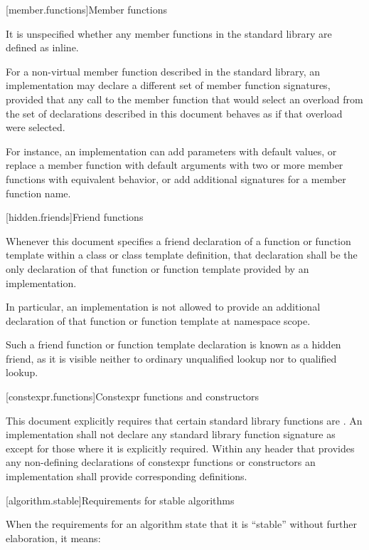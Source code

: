[member.functions]{Member functions}

\pnum
It is unspecified whether any member functions in the \Cpp{} standard library are defined as
inline.

\pnum
For a non-virtual member function described in the \Cpp{} standard library,
an implementation may declare a different set of member function signatures,
provided that any call to the member function that would select
an overload from the set of declarations described in this document
behaves as if that overload were selected.
\begin{note}
For instance, an implementation can add parameters with default values,
or replace a member function with default arguments
with two or more member functions with equivalent behavior,
or add additional signatures for a member function name.
\end{note}

[hidden.friends]{Friend functions}

\pnum
Whenever this document specifies
a friend declaration of a function or function template
within a class or class template definition,
that declaration shall be
the only declaration of that function or function template
provided by an implementation.
\begin{note}
In particular,
an implementation is not allowed to provide
an additional declaration of that function or function template
at namespace scope.
\end{note}
\begin{note}
Such a friend function or function template declaration
is known as a hidden friend,
as it is visible neither
to ordinary unqualified lookup nor
to qualified lookup.
\end{note}

[constexpr.functions]{Constexpr functions and constructors}

\pnum
This document explicitly requires that certain standard library functions are
. An implementation shall not declare
any standard library function signature as  except for those where
it is explicitly required.
Within any header that provides any non-defining declarations of constexpr
functions or constructors an implementation shall provide corresponding definitions.

[algorithm.stable]{Requirements for stable algorithms}

\pnum
{}%
%
When the requirements for an algorithm state that it is ``stable'' without further elaboration,
it means:

